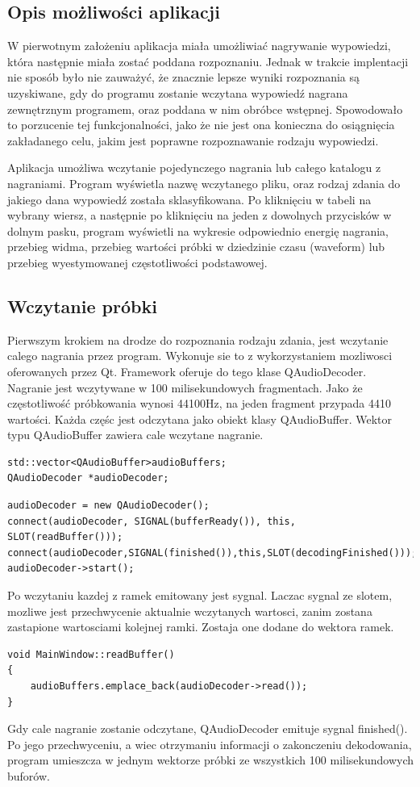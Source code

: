 \documentclass[a4paper,12 pt]{article}
\begin{document}
\subsection{Opis możliwości aplikacji}
W pierwotnym założeniu aplikacja miała umożliwiać nagrywanie wypowiedzi, która następnie miała zostać poddana rozpoznaniu. Jednak w trakcie implentacji nie sposób było nie zauważyć, że znacznie lepsze wyniki rozpoznania są uzyskiwane, gdy do programu zostanie wczytana wypowiedź nagrana zewnętrznym programem, oraz poddana w nim obróbce wstępnej. Spowodowało to porzucenie tej funkcjonalności, jako że nie jest ona konieczna do osiągnięcia zakładanego celu, jakim jest poprawne rozpoznawanie rodzaju wypowiedzi.

Aplikacja umożliwa wczytanie pojedynczego nagrania lub całego katalogu z nagraniami. Program wyświetla nazwę wczytanego pliku, oraz rodzaj zdania do jakiego dana wypowiedź została sklasyfikowana. Po kliknięciu w tabeli na wybrany wiersz, a następnie po kliknięciu na jeden z dowolnych przycisków w dolnym pasku, program wyświetli na wykresie odpowiednio energię nagrania, przebieg widma, przebieg wartości próbki w dziedzinie czasu (waveform) lub przebieg wyestymowanej częstotliwości podstawowej.
\subsection{Wczytanie próbki}
Pierwszym krokiem na drodze do rozpoznania rodzaju zdania, jest wczytanie calego nagrania przez program. Wykonuje sie to z wykorzystaniem mozliwosci oferowanych przez Qt. Framework oferuje do tego klase QAudioDecoder. 
Nagranie jest wczytywane w 100 milisekundowych fragmentach. Jako że częstotliwość próbkowania wynosi 44100Hz, na jeden fragment przypada 4410 wartości. Każda częśc jest odczytana jako obiekt klasy QAudioBuffer. Wektor typu QAudioBuffer zawiera cale wczytane nagranie.
\begin{lstlisting}
std::vector<QAudioBuffer>audioBuffers;
QAudioDecoder *audioDecoder;
\end{lstlisting}
\begin{lstlisting}
audioDecoder = new QAudioDecoder();
connect(audioDecoder, SIGNAL(bufferReady()), this, SLOT(readBuffer()));
connect(audioDecoder,SIGNAL(finished()),this,SLOT(decodingFinished()));
audioDecoder->start();
\end{lstlisting}
Po wczytaniu kazdej z ramek emitowany jest sygnal. Laczac sygnal ze slotem, mozliwe jest przechwycenie aktualnie wczytanych wartosci, zanim zostana zastapione wartosciami kolejnej ramki.
Zostaja one dodane do wektora ramek.
\begin{lstlisting}
void MainWindow::readBuffer()
{
    audioBuffers.emplace_back(audioDecoder->read());
}
\end{lstlisting}
Gdy cale nagranie zostanie odczytane, QAudioDecoder emituje sygnal finished(). Po jego przechwyceniu, a wiec otrzymaniu informacji o zakonczeniu dekodowania, program umieszcza w jednym wektorze próbki ze wszystkich 100 milisekundowych buforów.
\end{document}
